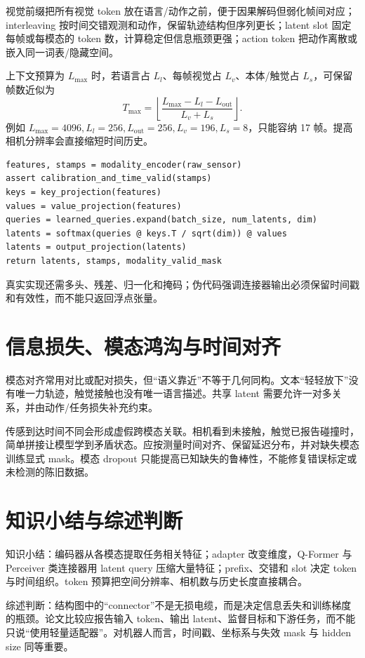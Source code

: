 视觉前缀把所有视觉 token 放在语言/动作之前，便于因果解码但弱化帧间对应；interleaving 按时间交错观测和动作，保留轨迹结构但序列更长；latent slot 固定每帧或每模态的 token 数，计算稳定但信息瓶颈更强；action token 把动作离散或嵌入同一词表/隐藏空间。

上下文预算为 $L_{\max}$ 时，若语言占 $L_l$、每帧视觉占 $L_v$、本体/触觉占 $L_s$，可保留帧数近似为
\begin{equation}
T_{\max}=\left\lfloor\frac{L_{\max}-L_l-L_{\mathrm{out}}}{L_v+L_s}\right\rfloor.
\end{equation}
例如 $L_{\max}=4096,L_l=256,L_{\mathrm{out}}=256,L_v=196,L_s=8$，只能容纳 17 帧。提高相机分辨率会直接缩短时间历史。

\begin{lstlisting}[caption={最小 latent-query 连接器教学伪代码}]
features, stamps = modality_encoder(raw_sensor)
assert calibration_and_time_valid(stamps)
keys = key_projection(features)
values = value_projection(features)
queries = learned_queries.expand(batch_size, num_latents, dim)
latents = softmax(queries @ keys.T / sqrt(dim)) @ values
latents = output_projection(latents)
return latents, stamps, modality_valid_mask
\end{lstlisting}

真实实现还需多头、残差、归一化和掩码；伪代码强调连接器输出必须保留时间戳和有效性，而不能只返回浮点张量。

\section{信息损失、模态鸿沟与时间对齐}

模态对齐常用对比或配对损失，但“语义靠近”不等于几何同构。文本“轻轻放下”没有唯一力轨迹，触觉接触也没有唯一语言描述。共享 latent 需要允许一对多关系，并由动作/任务损失补充约束。

传感到达时间不同会形成虚假跨模态关联。相机看到未接触，触觉已报告碰撞时，简单拼接让模型学到矛盾状态。应按测量时间对齐、保留延迟分布，并对缺失模态训练显式 mask。模态 dropout 只能提高已知缺失的鲁棒性，不能修复错误标定或未检测的陈旧数据。

\section{知识小结与综述判断}

知识小结：编码器从各模态提取任务相关特征；adapter 改变维度，Q-Former 与 Perceiver 类连接器用 latent query 压缩大量特征；prefix、交错和 slot 决定 token 与时间组织。token 预算把空间分辨率、相机数与历史长度直接耦合。

综述判断：结构图中的“connector”不是无损电缆，而是决定信息丢失和训练梯度的瓶颈。论文比较应报告输入 token、输出 latent、监督目标和下游任务，而不能只说“使用轻量适配器”。对机器人而言，时间戳、坐标系与失效 mask 与 hidden size 同等重要。
